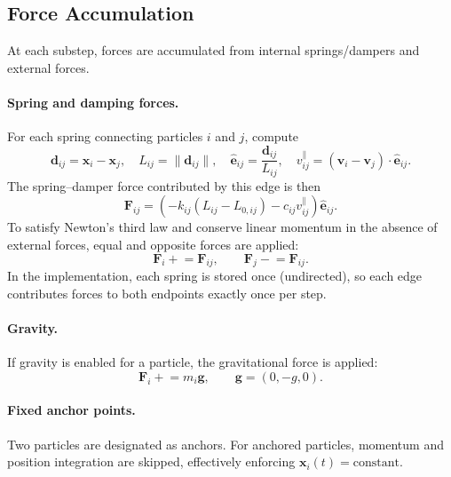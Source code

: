 \documentclass[manuscript,nonacm,12pt,letterpaper]{acmart}
\begin{document}
\subsection{Force Accumulation}
\label{Sec6.4:ForceAcc}

At each substep, forces are accumulated from internal springs/dampers and external forces.

\paragraph{Spring and damping forces.}
For each spring connecting particles $i$ and $j$, compute
\[
\mathbf{d}_{ij} = \mathbf{x}_i - \mathbf{x}_j,\quad
L_{ij} = \|\mathbf{d}_{ij}\|,\quad
\hat{\mathbf{e}}_{ij} = \frac{\mathbf{d}_{ij}}{L_{ij}},
\quad
v^{\parallel}_{ij} = (\mathbf{v}_i - \mathbf{v}_j)\cdot \hat{\mathbf{e}}_{ij}.
\]
The spring--damper force contributed by this edge is then
\begin{equation}
\mathbf{F}_{ij}
=
\left(
-k_{ij}(L_{ij}-L_{0,ij})
-c_{ij} v^{\parallel}_{ij}
\right)\hat{\mathbf{e}}_{ij}.
\label{eq:impl_edge_force}
\end{equation}
To satisfy Newton's third law and conserve linear momentum in the absence of external forces, equal and opposite forces are applied:
\begin{equation}
\mathbf{F}_i \mathrel{+}= \mathbf{F}_{ij},\qquad
\mathbf{F}_j \mathrel{-}= \mathbf{F}_{ij}.
\label{eq:impl_equal_opposite}
\end{equation}
In the implementation, each spring is stored once (undirected), so each edge contributes forces to both endpoints exactly once per step.

\paragraph{Gravity.}
If gravity is enabled for a particle, the gravitational force is applied:
\begin{equation}
\mathbf{F}_i \mathrel{+}= m_i \mathbf{g},\qquad \mathbf{g}=(0,-g,0).
\end{equation}

\paragraph{Fixed anchor points.}
Two particles are designated as anchors. For anchored particles, momentum and position integration are skipped, effectively enforcing $\mathbf{x}_i(t)=\text{constant}$.
\end{document}
